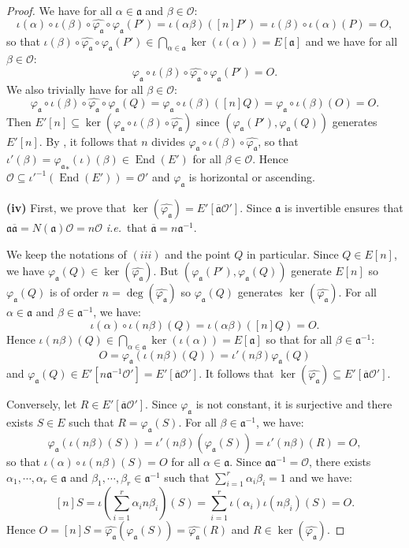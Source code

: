 \documentclass[a4paper,10pt,notitlepage]{report}
\theoremstyle{definition}
\theoremstyle{plain}
\theoremstyle{definition}
\newcommand{\ie}{\emph{i.e.}\ }
\newcommand{\mO}{\mathcal{O}}
\renewcommand{\(}{\left(}
\renewcommand{\)}{\right)}
\newcommand{\mf}[1]{\mathfrak{#1}}
\DeclareMathOperator{\End}{End}
\begin{document}
\begin{proof}
We have for all $\alpha\in \mf{a}$ and $\beta\in\mO$:
\[\iota(\alpha)\circ\iota(\beta)\circ\widehat{\varphi_{\mf{a}}}\circ\varphi_{\mf{a}}(P')=\iota(\alpha\beta)([n]P')=\iota(\beta)\circ\iota(\alpha)(P)=O,\]
so that $\iota(\beta)\circ\widehat{\varphi_{\mf{a}}}\circ\varphi_{\mf{a}}(P')\in\bigcap_{\alpha\in\mf{a}}\ker(\iota(\alpha))=E[\mf{a}]$ and we have for all $\beta\in\mO$:
\[\varphi_{\mf{a}}\circ\iota(\beta)\circ\widehat{\varphi_{\mf{a}}}\circ\varphi_{\mf{a}}(P')=O.\]
We also trivially have for all $\beta\in\mO$:
\[\varphi_{\mf{a}}\circ\iota(\beta)\circ\widehat{\varphi_{\mf{a}}}\circ\varphi_{\mf{a}}(Q)=\varphi_{\mf{a}}\circ\iota(\beta)([n]Q)=\varphi_{\mf{a}}\circ\iota(\beta)(O)=O.\]
Then $E'[n]\subseteq \ker(\varphi_{\mf{a}}\circ\iota(\beta)\circ\widehat{\varphi_{\mf{a}}})$ since $(\varphi_{\mf{a}}(P'),\varphi_{\mf{a}}(Q))$ generates $E'[n]$.  By \cite[Corollary III.4.11]{Silverman1}, it follows that $n$ divides $\varphi_{\mf{a}}\circ\iota(\beta)\circ\widehat{\varphi_{\mf{a}}}$, so that $\iota'(\beta)={\varphi_{\mf{a}}}_*(\iota)(\beta)\in\End(E')$ for all $\beta\in\mO$. Hence $\mO\subseteq\iota'^{-1}(\End(E'))=\mO'$ and $\varphi_{\mf{a}}$ is horizontal or ascending.

\textbf{(iv)} First, we prove that $\ker(\widehat{\varphi_{\mf{a}}})=E'[\overline{\mf{a}}\mO']$. Since $\mf{a}$ is invertible \cite[Lemma 7.14.(iii)]{Cox} ensures that $\mf{a}\overline{\mf{a}}=N(\mf{a})\mO=n\mO$ \ie that $\overline{\mf{a}}=n\mf{a}^{-1}$. 

We keep the notations of $(iii)$ and the point $Q$ in particular. Since $Q\in E[n]$, we have $\varphi_{\mf{a}}(Q)\in\ker(\widehat{\varphi_{\mf{a}}})$. But $(\varphi_{\mf{a}}(P'),\varphi_{\mf{a}}(Q))$ generate $E[n]$ so $\varphi_{\mf{a}}(Q)$ is of order $n=\deg(\widehat{\varphi_{\mf{a}}})$ so $\varphi_{\mf{a}}(Q)$ generates $\ker(\widehat{\varphi_{\mf{a}}})$.  For all $\alpha\in\mf{a}$ and $\beta\in\mf{a}^{-1}$, we have:
\[\iota(\alpha)\circ\iota(n\beta)(Q)=\iota(\alpha \beta)([n]Q)=O.\]
Hence $\iota(n\beta)(Q)\in\bigcap_{\alpha\in\mf{a}}\ker(\iota(\alpha))=E[\mf{a}]$ so that for all $\beta\in\mf{a}^{-1}$:
\[O=\varphi_{\mf{a}}(\iota(n\beta)(Q))=\iota'(n\beta)\varphi_{\mf{a}}(Q)\]
and $\varphi_{\mf{a}}(Q)\in E'[n\mf{a}^{-1}\mO']=E'[\overline{\mf{a}}\mO']$. It follows that $\ker(\widehat{\varphi_{\mf{a}}})\subseteq E'[\overline{\mf{a}}\mO']$. 


Conversely, let $R\in E'[\overline{\mf{a}}\mO']$. Since $\varphi_{\mf{a}}$ is not constant, it is surjective and there exists $S\in E$ such that $R=\varphi_{\mf{a}}(S)$. For all $\beta\in\mf{a}^{-1}$, we have:
\[\varphi_{\mf{a}}(\iota(n\beta)(S))=\iota'(n\beta)(\varphi_{\mf{a}}(S))=\iota'(n\beta)(R)=O,\]
so that $\iota(\alpha)\circ \iota(n\beta)(S)=O$ for all $\alpha\in \mf{a}$. Since $\mf{a}\mf{a}^{-1}=\mO$, there exists $\alpha_1, \cdots, \alpha_r\in\mf{a}$ and $\beta_1, \cdots, \beta_r\in\mf{a}^{-1}$ such that $\sum_{i=1}^r \alpha_i\beta_i=1$ and we have:
\[[n]S=\iota\(\sum_{i=1}^r \alpha_i n\beta_i\)(S)=\sum_{i=1}^r\iota(\alpha_i)\iota(n\beta_i)(S)=O.\]
Hence $O=[n]S=\widehat{\varphi_{\mf{a}}}(\varphi_{\mf{a}}(S))=\widehat{\varphi_{\mf{a}}}(R)$ and $R\in\ker(\widehat{\varphi_{\mf{a}}})$. 


\end{proof}
\end{document}

